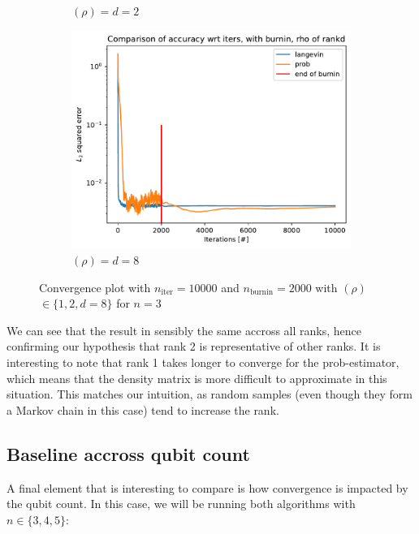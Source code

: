 \documentclass[12pt]{memoir}
\newcommand{\nitern}[1]{$n_{\text{iter}}=#1$}
\newcommand{\nburninn}[1]{$n_{\text{burnin}}=#1$}
\newcommand{\rhorankn}[1]{\text{rank}$(\rho)=#1$}
\newcommand{\rhorank}[0]{\text{rank}$(\rho) $ }
\begin{document}
\begin{figure}[H]
\begin{subfigure}[b]{0.49\textwidth}
        \caption{\rhorankn{d=2}}
        \label{fig:conv-plot-diff-rank-2-sub}
    \end{subfigure}
    \begin{subfigure}[b]{0.49\textwidth}
        \centering
        \includegraphics[width=\textwidth]{figures/experiments/baseline/diff_rank/iters_acc_comp_iters_no_avg_rankd-1.png}
        \caption{\rhorankn{d=8}}
        \label{fig:conv-plot-diff-rank-d-sub}
    \end{subfigure}
    \caption{Convergence plot with \nitern{10000} and \nburninn{2000} with \rhorank $\in \{1,2,d=8\}$ for $n=3$  }
    \label{fig:conv-plot-diff-rank}
\end{figure}

We can see that the result in sensibly the same accross all ranks, hence confirming our hypothesis that rank 2 is representative of other ranks. It is interesting to note that rank 1 takes longer to converge for the prob-estimator, which means that the density matrix is more difficult to approximate in this situation. This matches our intuition, as random samples (even though they form a Markov chain in this case) tend to increase the rank.

\subsection*{Baseline accross qubit count}

A final element that is interesting to compare is how convergence is impacted by the qubit count. In this case, we will be running both algorithms with $n\in\{3,4,5\}$:
\end{document}
